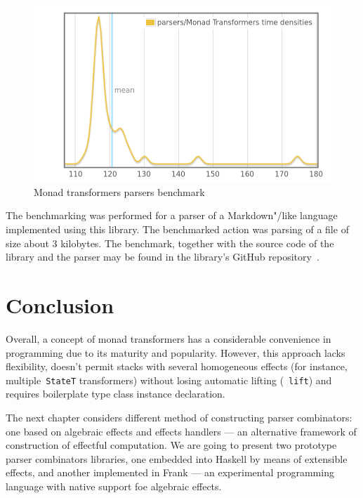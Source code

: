       \begin{figure}[h]
      \includegraphics[scale=0.4]{images/monad-trans.png}
      \caption{Monad transformers parsers benchmark}
      \label{mtlParserBench}
      \end{figure}

      The benchmarking was performed for a parser of a Markdown"/like language
      implemented using this library. The benchmarked action was parsing of a
      file of size about 3 kilobytes. The benchmark, together with the source code
      of the library and the parser may be found in the library's GitHub
      repository~\cite{mdParse}.


    \section{Conclusion}

    Overall, a concept of monad transformers has a considerable convenience in programming due to
    its maturity and popularity. However, this
    approach lacks flexibility, doesn't permit stacks with several homogeneous
    effects (for instance, multiple~\texttt{StateT} transformers) without
    losing automatic lifting (~\texttt{lift}) and requires boilerplate
    type class instance declaration.

    The next chapter considers different method of constructing parser combinators: one
    based on algebraic effects and effects handlers --- an alternative framework of construction of effectful computation. We are going to present two prototype
    parser combinators libraries, one embedded into Haskell by means of extensible
    effects, and another implemented in Frank --- an experimental programming language
    with native support foe algebraic effects.